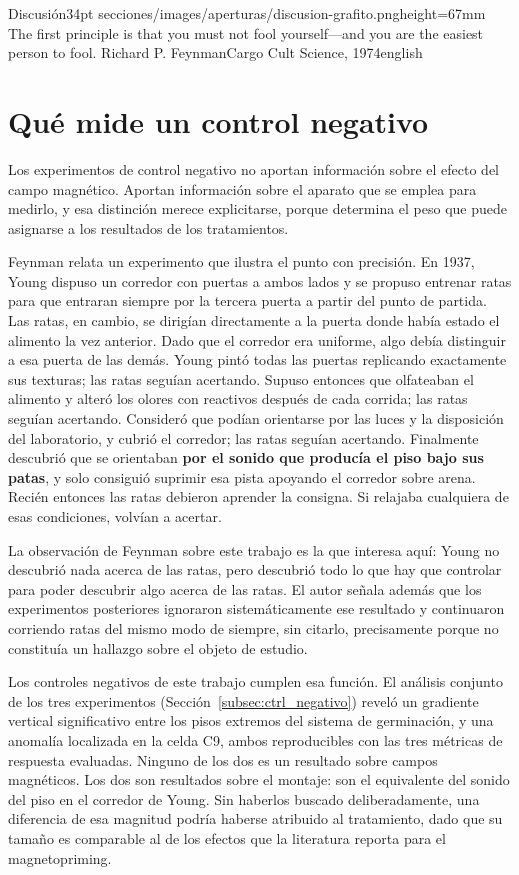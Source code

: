 \aperturacapitulo
  {Discusión}{34pt}
  {secciones/images/aperturas/discusion-grafito.png}{height=67mm}
  {The first principle is that you must not fool yourself---and you are the easiest person to fool.}
  {Richard P. Feynman}{Cargo Cult Science, 1974}{english}

\section{Qué mide un control negativo}
\label{sec:disc_controles}

Los experimentos de control negativo no aportan información sobre el efecto del campo magnético. Aportan información sobre el aparato que se emplea para medirlo, y esa distinción merece explicitarse, porque determina el peso que puede asignarse a los resultados de los tratamientos.

Feynman \cite{feynman_1974} relata un experimento que ilustra el punto con precisión. En 1937, Young dispuso un corredor con puertas a ambos lados y se propuso entrenar ratas para que entraran siempre por la tercera puerta a partir del punto de partida. Las ratas, en cambio, se dirigían directamente a la puerta donde había estado el alimento la vez anterior. Dado que el corredor era uniforme, algo debía distinguir a esa puerta de las demás. Young pintó todas las puertas replicando exactamente sus texturas; las ratas seguían acertando. Supuso entonces que olfateaban el alimento y alteró los olores con reactivos después de cada corrida; las ratas seguían acertando. Consideró que podían orientarse por las luces y la disposición del laboratorio, y cubrió el corredor; las ratas seguían acertando. Finalmente descubrió que se orientaban \textbf{por el sonido que producía el piso bajo sus patas}, y solo consiguió suprimir esa pista apoyando el corredor sobre arena. Recién entonces las ratas debieron aprender la consigna. Si relajaba cualquiera de esas condiciones, volvían a acertar.

La observación de Feynman sobre este trabajo es la que interesa aquí: Young no descubrió nada acerca de las ratas, pero descubrió todo lo que hay que controlar para poder descubrir algo acerca de las ratas. El autor señala además que los experimentos posteriores ignoraron sistemáticamente ese resultado y continuaron corriendo ratas del mismo modo de siempre, sin citarlo, precisamente porque no constituía un hallazgo sobre el objeto de estudio.

Los controles negativos de este trabajo cumplen esa función. El análisis conjunto de los tres experimentos (Sección~\ref{subsec:ctrl_negativo}) reveló un gradiente vertical significativo entre los pisos extremos del sistema de germinación, y una anomalía localizada en la celda C9, ambos reproducibles con las tres métricas de respuesta evaluadas. Ninguno de los dos es un resultado sobre campos magnéticos. Los dos son resultados sobre el montaje: son el equivalente del sonido del piso en el corredor de Young. Sin haberlos buscado deliberadamente, una diferencia de esa magnitud podría haberse atribuido al tratamiento, dado que su tamaño es comparable al de los efectos que la literatura reporta para el magnetopriming.

